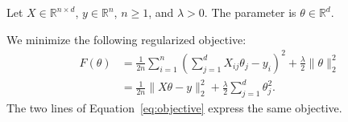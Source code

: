 Let $X\in\mathbb{R}^{n\times d}$, $y\in\mathbb{R}^{n}$,
$n\geq 1$, and $\lambda>0$. The parameter is $\theta\in\mathbb{R}^d$.

We minimize the following regularized objective:
\begin{align}
F(\theta)
 &= \frac{1}{2n}\sum_{i=1}^{n}
    \left(\sum_{j=1}^{d}X_{ij}\theta_j-y_i\right)^2
    +\frac{\lambda}{2}\|\theta\|_2^2 \label{eq:objective}\\
 &= \frac{1}{2n}\|X\theta-y\|_2^2
    +\frac{\lambda}{2}\sum_{j=1}^{d}\theta_j^2. \nonumber
\end{align}
The two lines of Equation~\eqref{eq:objective} express the same objective.
